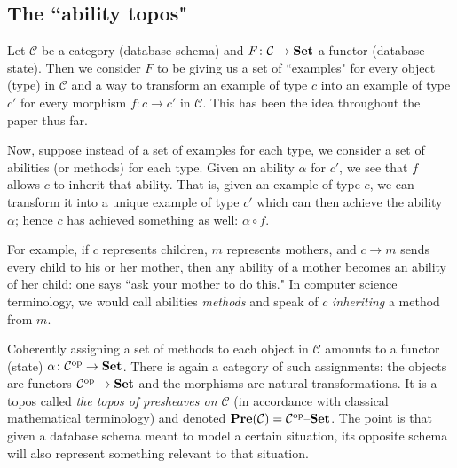 \documentclass{amsart}
\def\tn{\textnormal}
\def\mc{\mathcal}
\def\to{\rightarrow}
\def\taking{\colon}
\def\op{^\tn{op}}
\def\Set{{\bf Set}}
\def\set{{\text \textendash}{\bf Set}}
\def\Pre{{\bf Pre}}
\def\mcC{\mc{C}}
\theoremstyle{remark}
\theoremstyle{definition}
\begin{document}
\subsection{The ``ability topos"}

Let $\mcC$ be a category (database schema) and $F\taking\mcC\to\Set$ a functor (database state).  Then we consider $F$ to be giving us a set of ``examples" for every object (type) in $\mcC$ and a way to transform an example of type $c$ into an example of type $c'$ for every morphism $f\taking c\to c'$ in $\mcC$.  This has been the idea throughout the paper thus far.

Now, suppose instead of a set of examples for each type, we consider a set of abilities (or methods) for each type.  Given an ability $\alpha$ for $c'$, we see that $f$ allows $c$ to inherit that ability.  That is, given an example of type $c$, we can transform it into a unique example of type $c'$ which can then achieve the ability $\alpha$; hence $c$ has achieved something as well: $\alpha\circ f$. 

For example, if $c$ represents children, $m$ represents mothers, and $c\to m$ sends every child to his or her mother, then any ability of a mother becomes an ability of her child: one says ``ask your mother to do this."  In computer science terminology, we would call abilities {\em methods} and speak of $c$ {\em inheriting} a method from $m$.

Coherently assigning a set of methods to each object in $\mcC$ amounts to a functor (state) $\alpha\taking\mcC\op\to\Set$.  There is again a category of such assignments: the objects are functors $\mcC\op\to\Set$ and the morphisms are natural transformations.  It is a topos called {\em the topos of presheaves on $\mcC$} (in accordance with classical mathematical terminology) and denoted $\Pre(\mcC)=\mcC\op\set$.   The point is that given a database schema meant to model a certain situation, its opposite schema will also represent something relevant to that situation.
\end{document}
